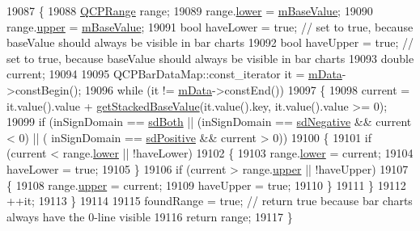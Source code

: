 \begin{DoxyCode}
19087 \{
19088   \hyperlink{class_q_c_p_range}{QCPRange} range;
19089   range.\hyperlink{class_q_c_p_range_aa3aca3edb14f7ca0c85d912647b91745}{lower} = \hyperlink{class_q_c_p_bars_aa0515cf47fa6044cc28e59b1ae5ec759}{mBaseValue};
19090   range.\hyperlink{class_q_c_p_range_ae44eb3aafe1d0e2ed34b499b6d2e074f}{upper} = \hyperlink{class_q_c_p_bars_aa0515cf47fa6044cc28e59b1ae5ec759}{mBaseValue};
19091   \textcolor{keywordtype}{bool} haveLower = \textcolor{keyword}{true}; \textcolor{comment}{// set to true, because baseValue should always be visible in bar charts}
19092   \textcolor{keywordtype}{bool} haveUpper = \textcolor{keyword}{true}; \textcolor{comment}{// set to true, because baseValue should always be visible in bar charts}
19093   \textcolor{keywordtype}{double} current;
19094   
19095   QCPBarDataMap::const\_iterator it = \hyperlink{class_q_c_p_bars_aef28d29d51ef84b608ecd22c55d531ff}{mData}->constBegin();
19096   \textcolor{keywordflow}{while} (it != \hyperlink{class_q_c_p_bars_aef28d29d51ef84b608ecd22c55d531ff}{mData}->constEnd())
19097   \{
19098     current = it.value().value + \hyperlink{class_q_c_p_bars_ae9b0c2fad9f29030c84bb6e62a4b605f}{getStackedBaseValue}(it.value().key, it.value().value >=
       0);
19099     \textcolor{keywordflow}{if} (inSignDomain == \hyperlink{class_q_c_p_abstract_plottable_a661743478a1d3c09d28ec2711d7653d8a082b98cfb91a7363a3b5cd17b0c1cd60}{sdBoth} || (inSignDomain == \hyperlink{class_q_c_p_abstract_plottable_a661743478a1d3c09d28ec2711d7653d8a0fc9a70796ef60ad18ddd18056e6dc63}{sdNegative} && current < 0) || (
      inSignDomain == \hyperlink{class_q_c_p_abstract_plottable_a661743478a1d3c09d28ec2711d7653d8a02951859f243a4d24e779cfbb5471030}{sdPositive} && current > 0))
19100     \{
19101       \textcolor{keywordflow}{if} (current < range.\hyperlink{class_q_c_p_range_aa3aca3edb14f7ca0c85d912647b91745}{lower} || !haveLower)
19102       \{
19103         range.\hyperlink{class_q_c_p_range_aa3aca3edb14f7ca0c85d912647b91745}{lower} = current;
19104         haveLower = \textcolor{keyword}{true};
19105       \}
19106       \textcolor{keywordflow}{if} (current > range.\hyperlink{class_q_c_p_range_ae44eb3aafe1d0e2ed34b499b6d2e074f}{upper} || !haveUpper)
19107       \{
19108         range.\hyperlink{class_q_c_p_range_ae44eb3aafe1d0e2ed34b499b6d2e074f}{upper} = current;
19109         haveUpper = \textcolor{keyword}{true};
19110       \}
19111     \}
19112     ++it;
19113   \}
19114   
19115   foundRange = \textcolor{keyword}{true}; \textcolor{comment}{// return true because bar charts always have the 0-line visible}
19116   \textcolor{keywordflow}{return} range;
19117 \}
\end{DoxyCode}


